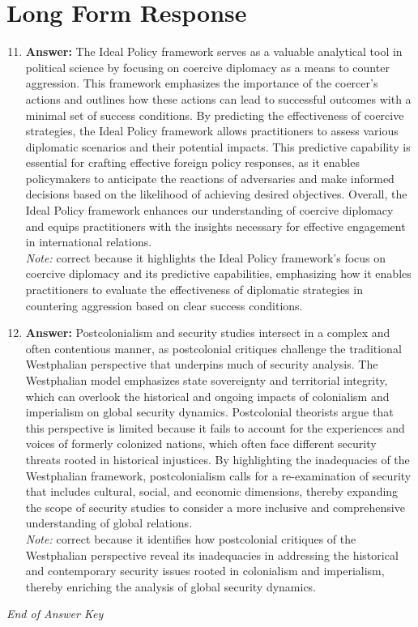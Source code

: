 \documentclass[12pt]{article}
\begin{document}
\section*{Long Form Response}
\begin{enumerate}[label=\arabic*.]
\setcounter{enumi}{10}
\item \textbf{Answer:} The Ideal Policy framework serves as a valuable analytical tool in political science by focusing on coercive diplomacy as a means to counter aggression. This framework emphasizes the importance of the coercer's actions and outlines how these actions can lead to successful outcomes with a minimal set of success conditions. By predicting the effectiveness of coercive strategies, the Ideal Policy framework allows practitioners to assess various diplomatic scenarios and their potential impacts. This predictive capability is essential for crafting effective foreign policy responses, as it enables policymakers to anticipate the reactions of adversaries and make informed decisions based on the likelihood of achieving desired objectives. Overall, the Ideal Policy framework enhances our understanding of coercive diplomacy and equips practitioners with the insights necessary for effective engagement in international relations.
\\ \textit{Note:} correct because it highlights the Ideal Policy framework's focus on coercive diplomacy and its predictive capabilities, emphasizing how it enables practitioners to evaluate the effectiveness of diplomatic strategies in countering aggression based on clear success conditions.
\item \textbf{Answer:} Postcolonialism and security studies intersect in a complex and often contentious manner, as postcolonial critiques challenge the traditional Westphalian perspective that underpins much of security analysis. The Westphalian model emphasizes state sovereignty and territorial integrity, which can overlook the historical and ongoing impacts of colonialism and imperialism on global security dynamics. Postcolonial theorists argue that this perspective is limited because it fails to account for the experiences and voices of formerly colonized nations, which often face different security threats rooted in historical injustices. By highlighting the inadequacies of the Westphalian framework, postcolonialism calls for a re-examination of security that includes cultural, social, and economic dimensions, thereby expanding the scope of security studies to consider a more inclusive and comprehensive understanding of global relations.
\\ \textit{Note:} correct because it identifies how postcolonial critiques of the Westphalian perspective reveal its inadequacies in addressing the historical and contemporary security issues rooted in colonialism and imperialism, thereby enriching the analysis of global security dynamics.
\end{enumerate}

\vfill
\noindent\textit{End of Answer Key}
\end{document}
